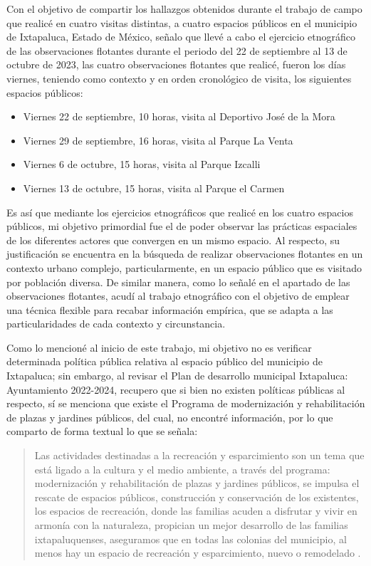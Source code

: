 \documentclass[
  spanish,
  11pt,
  a4paper,
]{scrbook}
\begin{document}

Con el objetivo de compartir los hallazgos obtenidos durante el trabajo
de campo que realicé en cuatro visitas distintas, a cuatro espacios
públicos en el municipio de Ixtapaluca, Estado de México, señalo que
llevé a cabo el ejercicio etnográfico de las observaciones flotantes
durante el periodo del 22 de septiembre al 13 de octubre de 2023, las
cuatro observaciones flotantes que realicé, fueron los días viernes,
teniendo como contexto y en orden cronológico de visita, los siguientes
espacios públicos:

\begin{itemize}
\item
  Viernes 22 de septiembre, 10 horas, visita al Deportivo José de la
  Mora
\item
  Viernes 29 de septiembre, 16 horas, visita al Parque La Venta
\item
  Viernes 6 de octubre, 15 horas, visita al Parque Izcalli
\item
  Viernes 13 de octubre, 15 horas, visita al Parque el Carmen
\end{itemize}

Es así que mediante los ejercicios etnográficos que realicé en los
cuatro espacios públicos, mi objetivo primordial fue el de poder
observar las prácticas espaciales de los diferentes actores que
convergen en un mismo espacio. Al respecto, su justificación se
encuentra en la búsqueda de realizar observaciones flotantes en un
contexto urbano complejo, particularmente, en un espacio público que es
visitado por población diversa. De similar manera, como lo señalé en el
apartado de las observaciones flotantes, acudí al trabajo etnográfico
con el objetivo de emplear una técnica flexible para recabar información
empírica, que se adapta a las particularidades de cada contexto y
circunstancia.

Como lo mencioné al inicio de este trabajo, mi objetivo no es verificar
determinada política pública relativa al espacio público del municipio
de Ixtapaluca; sin embargo, al revisar el Plan de desarrollo municipal
Ixtapaluca: Ayuntamiento 2022-2024, recupero que si bien no existen
políticas públicas al respecto, sí se menciona que existe el Programa de
modernización y rehabilitación de plazas y jardines públicos, del cual,
no encontré información, por lo que comparto de forma textual lo que se
señala:

\begin{quote}
Las actividades destinadas a la recreación y esparcimiento son un tema
que está ligado a la cultura y el medio ambiente, a través del programa:
modernización y rehabilitación de plazas y jardines públicos, se impulsa
el rescate de espacios públicos, construcción y conservación de los
existentes, los espacios de recreación, donde las familias acuden a
disfrutar y vivir en armonía con la naturaleza, propician un mejor
desarrollo de las familias ixtapaluquenses, aseguramos que en todas las
colonias del municipio, al menos hay un espacio de recreación y
esparcimiento, nuevo o remodelado
\autocite[230]{AyuntamientoIxtapaluca2022}.
\end{quote}
\end{document}
